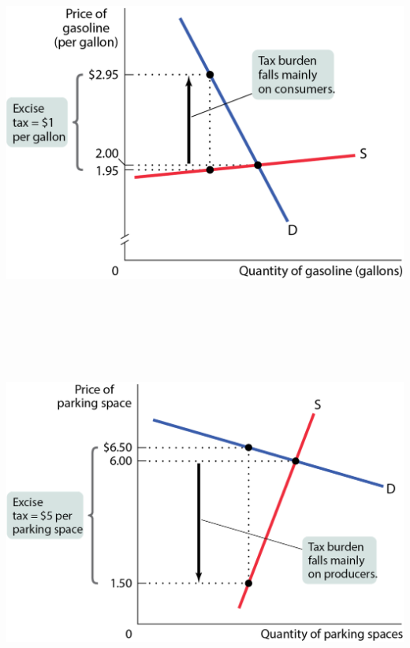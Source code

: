 \documentclass[
  ignorenonframetext,
]{beamer}
\begin{document}
\begin{frame}{}
\protect\hypertarget{section-10}{}
\includegraphics[width=\textwidth,height=4.6875in]{figures/fig14_4.png}
\end{frame}

\begin{frame}{}
\protect\hypertarget{section-11}{}
\includegraphics[width=\textwidth,height=4.6875in]{figures/fig14_5.png}
\end{frame}
\end{document}
